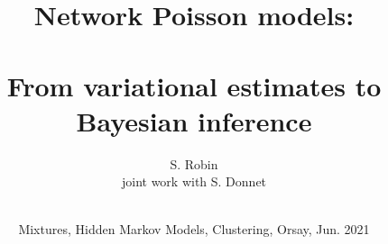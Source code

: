 \documentclass[8pt]{beamer}
\begin{document}

\title[Network Poisson models]{Network Poisson models: \\ ~\\
From variational estimates to Bayesian inference \\}

\author[S. Robin]{S. Robin \\ \medskip
joint work with S. Donnet \\ ~}


\date[MHC, Orsay, Jun.'21]{Mixtures, Hidden Markov Models, Clustering, Orsay, Jun. 2021}

\maketitle

\end{document}
